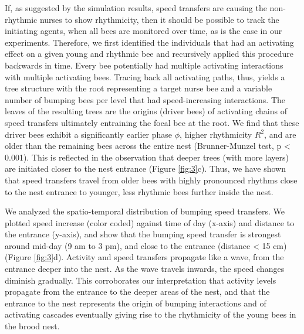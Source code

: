 \documentclass{article}
\begin{document}
If, as suggested by the simulation results, speed transfers are causing the non-rhythmic nurses to show rhythmicity, then it should be possible to track the initiating agents, when all bees are monitored over time, as is the case in our experiments. Therefore, we first identified the individuals that had an activating effect on a given young and rhythmic bee and recursively applied this procedure backwards in time. Every bee potentially had multiple activating interactions with multiple activating bees. Tracing back all activating paths, thus, yields a tree structure with the root representing a target nurse bee and a variable number of bumping bees per level that had speed-increasing interactions. The leaves of the resulting trees are the origins (driver bees) of activating chains of speed transfers ultimately entraining the focal bee at the root. We find that these driver bees exhibit a significantly earlier phase $\phi$, higher rhythmicity $R^2$, and are older than the remaining bees across the entire nest (Brunner-Munzel test, p < 0.001). This is reflected in the observation that deeper trees (with more layers) are initiated closer to the nest entrance (Figure \ref{fig:3}c). Thus, we have shown that speed transfers travel from older bees with highly pronounced rhythms close to the nest entrance to younger, less rhythmic bees further inside the nest. 

We analyzed the spatio-temporal distribution of  bumping speed transfers. We plotted speed increase (color coded) against time of day (x-axis) and distance to the entrance (y-axis), and show that the bumping speed transfer is strongest around mid-day (9 am to 3 pm), and close to the entrance (distance < 15 cm) (Figure \ref{fig:3}d). Activity and speed transfers propagate like a wave, from the entrance deeper into the nest. As the wave travels inwards, the speed changes diminish gradually. This corroborates our interpretation that activity levels propagate from the entrance to the deeper areas of the nest, and that the entrance to the nest represents the origin of bumping interactions and of activating cascades eventually giving rise to the rhythmicity of the young bees in the brood nest.
\end{document}
